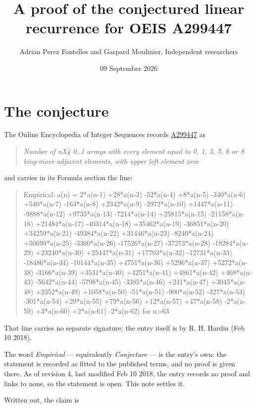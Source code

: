 \documentclass[11pt]{article}
\title{A proof of the conjectured linear recurrence for OEIS A299447}
\author{Adrian Perez Fontelles and Gaspard Moulinier, Independent researchers}
\date{09 September 2026}
\theoremstyle{definition}
\begin{document}
\maketitle
\section{The conjecture}

The Online Encyclopedia of Integer Sequences records \href{https://oeis.org/A299447}{A299447} as

\begin{quote}\itshape Number of nX4 0..1 arrays with every element equal to 0, 1, 3, 5, 6 or 8 king-move adjacent elements, with upper left element zero\end{quote}

and carries in its Formula section the line:

\begin{quote}\ttfamily Empirical: a(n) = 2*a(n-1) +28*a(n-3) -52*a(n-4) +8*a(n-5) -340*a(n-6) +540*a(n-7) -163*a(n-8) +2342*a(n-9) -2972*a(n-10) +1447*a(n-11) -9888*a(n-12) +9735*a(n-13) -7214*a(n-14) +25815*a(n-15) -21158*a(n-16) +21484*a(n-17) -40314*a(n-18) +35462*a(n-19) -36851*a(n-20) +34259*a(n-21) -49384*a(n-22) +31446*a(n-23) -8240*a(n-24) +50699*a(n-25) -3360*a(n-26) -17526*a(n-27) -37273*a(n-28) -19284*a(n-29) +23240*a(n-30) +25447*a(n-31) +17703*a(n-32) -12731*a(n-33) -18486*a(n-34) -10144*a(n-35) +4751*a(n-36) +5296*a(n-37) +5272*a(n-38) -3166*a(n-39) +3531*a(n-40) +4251*a(n-41) +4861*a(n-42) +468*a(n-43) -5642*a(n-44) -5798*a(n-45) -3385*a(n-46) +241*a(n-47) +3045*a(n-48) +2352*a(n-49) +1058*a(n-50) -51*a(n-51) -900*a(n-52) -327*a(n-53) -301*a(n-54) +29*a(n-55) +79*a(n-56) +12*a(n-57) +47*a(n-58) -2*a(n-59) +3*a(n-60) +2*a(n-61) -2*a(n-62) for n>63\end{quote}

That line carries no separate signature; the entry itself is by R. H. Hardin (Feb 10 2018).

The word {\itshape Empirical} --- equivalently {\itshape Conjecture} --- is the entry's own: the statement is recorded as fitted to the published terms, and no proof is given there. As of revision 4, last modified Feb 10 2018, the entry records no proof and links to none, so the statement is open. This note settles it.

Written out, the claim is
\end{document}

